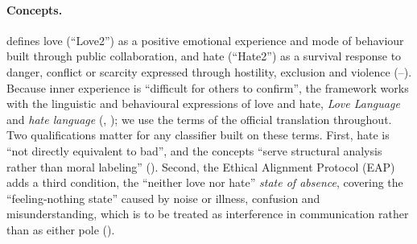 \paragraph{Concepts.}
\pol{} defines love (``Love2'') as a positive emotional experience and mode of behaviour built through public collaboration, and hate (``Hate2'') as a survival response to danger, conflict or scarcity expressed through hostility, exclusion and violence (--).
Because inner experience is ``difficult for others to confirm'', the framework works with the linguistic and behavioural expressions of love and hate, \emph{Love Language} and \emph{hate language} (, ); we use the terms of the official translation throughout.
Two qualifications matter for any classifier built on these terms.
First, hate is ``not directly equivalent to bad'', and the concepts ``serve structural analysis rather than moral labeling'' ().
Second, the Ethical Alignment Protocol (EAP) adds a third condition, the ``neither love nor hate'' \emph{state of absence}, covering the ``feeling-nothing state'' caused by noise or illness, confusion and misunderstanding, which is to be treated as interference in communication rather than as either pole ().

